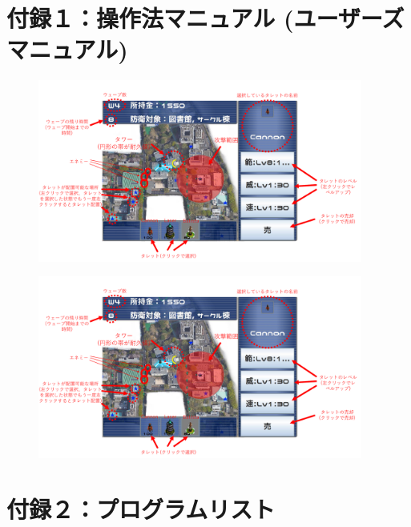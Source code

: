 \documentclass[11pt,a4j]{jarticle}
\begin{document}
\newpage
\section*{付録１：操作法マニュアル (ユーザーズマニュアル)}


\begin{figure}[H]
    \centering
    \includegraphics[width=0.95\textwidth, page=1]{manual.pdf}
    \label{Manual p.1}
\end{figure}

\begin{figure}[H]
    \centering
    \includegraphics[width=0.95\textwidth, page=2]{manual.pdf}
    \label{Manual p.2}
\end{figure}

\newpage
\section*{付録２：プログラムリスト}
\end{document}
